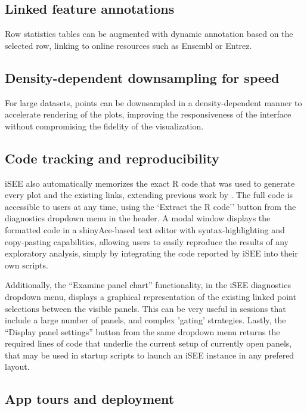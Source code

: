 \documentclass[10pt,a4paper,twocolumn]{article}
\let\cite\citep
\begin{document}
\subsection*{Linked feature annotations}

Row statistics tables can be augmented with dynamic annotation based on the selected row, linking to online resources such as Ensembl or Entrez. %

\subsection*{Density-dependent downsampling for speed}

For large datasets, points can be downsampled in a density-dependent manner to accelerate rendering of the plots, improving the responsiveness of the interface without compromising the fidelity of the visualization.

\subsection*{Code tracking and reproducibility}

iSEE also automatically memorizes the exact R code that was used to generate every plot and the existing links, extending previous work by \cite{marini2016interrepro}.
The full code is accessible to users at any time, using the `Extract the R code'' button from the diagnostics dropdown menu in the header.
A modal window displays the formatted code in a shinyAce-based text editor with syntax-highlighting and copy-pasting capabilities, allowing users to easily reproduce the results of any exploratory analysis, simply by integrating the code reported by iSEE into their own scripts.

Additionally, the ``Examine panel chart'' functionality, in the iSEE diagnostics dropdown menu, displays a graphical representation of the existing linked point selections between the visible panels. This can be very useful in sessions that include a large number of panels, and complex 'gating' strategies.
Lastly, the ``Display panel settings'' button from the same dropdown menu returns the required lines of code that underlie the current setup of currently open panels, that may be used in startup scripts to launch an iSEE instance in any prefered layout.

\subsection*{App tours and deployment}
\end{document}
